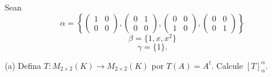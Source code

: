 \documentclass{article}
\begin{document}
	
	Sean
	\[
	\alpha = 
	\left\{
	\begin{pmatrix}
		1 & 0 \\
		0 & 0
	\end{pmatrix},
	\begin{pmatrix}
		0 & 1 \\
		0 & 0
	\end{pmatrix},
	\begin{pmatrix}
		0 & 0 \\
		1 & 0
	\end{pmatrix},
	\begin{pmatrix}
		0 & 0 \\
		0 & 1
	\end{pmatrix}
	\right\}
	\]
	\[
	\beta = \{1, x, x^2\}
	\]
	\[
	\gamma = \{1\}.
	\]
	
	(a) Defina \( T: M_{2\times2} (K) \to M_{2\times2} (K) \) por \( T(A) = A^t \). Calcule \([T]_{\alpha}^{\alpha}\).
	
\end{document}
